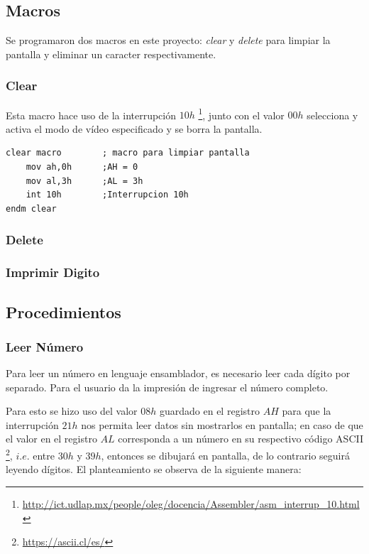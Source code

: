 \documentclass[letter,12 pt,titlepage]{article}
\begin{document}
    \subsection{Macros}

    Se programaron dos macros en este proyecto: \textit{clear} y \textit{delete} para limpiar la pantalla y eliminar un caracter respectivamente.

    \subsubsection{Clear}

    Esta macro hace uso de la interrupción $10h$ \footnote{\url{http://ict.udlap.mx/people/oleg/docencia/Assembler/asm_interrup_10.html}}, junto con el valor $00h$ selecciona y activa el modo de vídeo especificado y se borra la pantalla.

    \begin{verbatim}
clear macro        ; macro para limpiar pantalla
    mov ah,0h      ;AH = 0
    mov al,3h      ;AL = 3h
    int 10h        ;Interrupcion 10h
endm clear
    \end{verbatim}

    \subsubsection{Delete}
    \subsubsection{Imprimir Digito}
    \subsection{Procedimientos}
    \subsubsection{Leer Número}
    Para leer un número en lenguaje ensamblador, es necesario leer cada dígito por separado. Para el usuario da la impresión de ingresar el número completo.

    Para esto se hizo uso del valor $08h$ guardado en el registro $AH$ para que la interrupción $21h$ nos permita leer datos sin mostrarlos en pantalla; en caso de  que el valor en el registro $AL$ corresponda a un número en su respectivo código ASCII \footnote{\url{https://ascii.cl/es/}}, $i.e.$ entre $30h$ y $39h$, entonces se dibujará en pantalla, de lo contrario seguirá leyendo dígitos. El planteamiento se observa de la siguiente manera:
\end{document}
